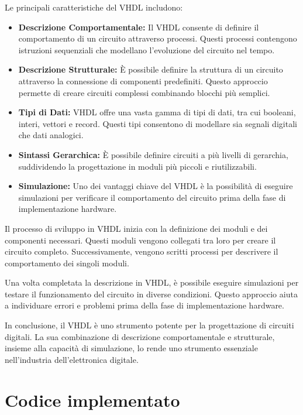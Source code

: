 \documentclass[titlepage]{report}
\begin{document}
		Le principali caratteristiche del VHDL includono:
		\begin{itemize}
			\item \textbf{Descrizione Comportamentale:} Il VHDL consente di definire il comportamento di un circuito attraverso processi. Questi processi contengono istruzioni sequenziali che modellano l'evoluzione del circuito nel tempo.
			
			\item \textbf{Descrizione Strutturale:} È possibile definire la struttura di un circuito attraverso la connessione di componenti predefiniti. Questo approccio permette di creare circuiti complessi combinando blocchi più semplici.
			
			\item \textbf{Tipi di Dati:} VHDL offre una vasta gamma di tipi di dati, tra cui booleani, interi, vettori e record. Questi tipi consentono di modellare sia segnali digitali che dati analogici.
			
			\item \textbf{Sintassi Gerarchica:} È possibile definire circuiti a più livelli di gerarchia, suddividendo la progettazione in moduli più piccoli e riutilizzabili.
			
			\item \textbf{Simulazione:} Uno dei vantaggi chiave del VHDL è la possibilità di eseguire simulazioni per verificare il comportamento del circuito prima della fase di implementazione hardware.
		\end{itemize}

		Il processo di sviluppo in VHDL inizia con la definizione dei moduli e dei componenti necessari. Questi moduli vengono collegati tra loro per creare il circuito completo. Successivamente, vengono scritti processi per descrivere il comportamento dei singoli moduli.

		Una volta completata la descrizione in VHDL, è possibile eseguire simulazioni per testare il funzionamento del circuito in diverse condizioni. Questo approccio aiuta a individuare errori e problemi prima della fase di implementazione hardware.

		In conclusione, il VHDL è uno strumento potente per la progettazione di circuiti digitali. La sua combinazione di descrizione comportamentale e strutturale, insieme alla capacità di simulazione, lo rende uno strumento essenziale nell'industria dell'elettronica digitale.
	\section{Codice implementato}
	\label{sec:vhdl_code}
		
\end{document}
